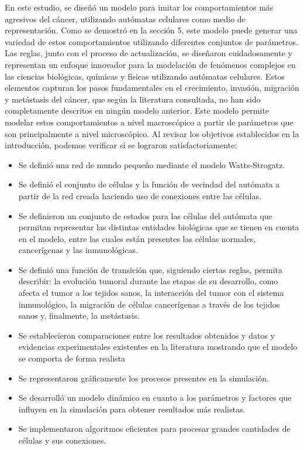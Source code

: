 \begin{conclusions}

En este estudio, se diseñó un modelo para imitar los comportamientos más agresivos del cáncer, utilizando autómatas celulares como medio de representación. Como se demostró en la sección 5, este modelo puede generar una variedad de estos comportamientos utilizando diferentes conjuntos de parámetros. Las reglas, junto con el proceso de actualización, se diseñaron cuidadosamente y representan un enfoque innovador para la modelación de fenómenos complejos en las ciencias biológicas, químicas y físicas utilizando autómatas celulares. Estos elementos capturan los pasos fundamentales en el crecimiento, invasión, migración y metástasis del cáncer, que según la literatura consultada, no han sido completamente descritos en ningún modelo anterior. Este modelo permite modelar estos comportamientos a nivel macroscópico a partir de parámetros que son principalmente a nivel microscópico. Al revisar los objetivos establecidos en la introducción, podemos verificar si se lograron satisfactoriamente:

\begin{itemize}
    \item Se definió una red de mundo pequeño mediante el modelo Watts-Strogatz.
    \item Se definió el conjunto de c\'elulas y la funci\'on de vecindad del aut\'omata a partir de la red creada haciendo uso de conexiones entre las c\'elulas.
    \item Se definieron un conjunto de estados para las c\'elulas del aut\'omata que permitan representar las distintas entidades biol\'ogicas que se tienen en cuenta en el modelo, entre las cuales est\'an presentes las c\'elulas normales, cancer\'igenas y las inmunol\'ogicas.
    \item Se definió una funci\'on de transición que, siguiendo ciertas reglas, permita describir: la evoluci\'on tumoral durante las etapas de su desarrollo, como afecta el tumor a los tejidos sanos, la interacci\'on del tumor con el sistema inmunol\'ogico, la migraci\'on de c\'elulas cancer\'igenas a trav\'es de los tejidos sanos y, finalmente, la met\'astasis.
    \item Se establecieron comparaciones entre los resultados obtenidos y datos y evidencias experimentales existentes en la literatura mostrando que el modelo se comporta de forma realista
    \item Se representaron gr\'aficamente los procesos presentes en la simulaci\'on.
    \item Se desarrolló un modelo din\'amico en cuanto a los par\'ametros y factores que influyen en la simulaci\'on para obtener resultados m\'as realistas.
    \item Se implementaron algoritmos eficientes para procesar grandes cantidades de células y sus conexiones.
\end{itemize}


\end{conclusions}
